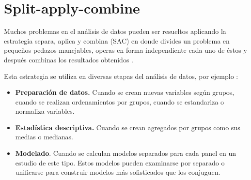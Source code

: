 \documentclass[]{article}
\newenvironment{Shaded}{\begin{snugshade}}{\end{snugshade}}
\newcommand{\KeywordTok}[1]{\textcolor[rgb]{0.13,0.29,0.53}{\textbf{#1}}}
\newcommand{\DecValTok}[1]{\textcolor[rgb]{0.00,0.00,0.81}{#1}}
\newcommand{\StringTok}[1]{\textcolor[rgb]{0.31,0.60,0.02}{#1}}
\newcommand{\OperatorTok}[1]{\textcolor[rgb]{0.81,0.36,0.00}{\textbf{#1}}}
\newcommand{\NormalTok}[1]{#1}
\providecommand{\tightlist}{%
  \setlength{\itemsep}{0pt}\setlength{\parskip}{0pt}}
\begin{document}
\begin{Shaded}
\end{Shaded}

\newpage

\section{Split-apply-combine}\label{split-apply-combine}

Muchos problemas en el análisis de datos pueden ser resueltos aplicando
la estrategia separa, aplica y combina (SAC) en donde divides un
problema en pequeños pedazos manejables, operas en forma independiente
cada uno de éstos y después combinas los resultados obtenidos
\parencite{wickham2011split}.

Esta estrategia se utiliza en diversas etapas del análisis de datos, por
ejemplo \parencite{wickham2011split}:

\begin{itemize}
\tightlist
\item
  \textbf{Preparación de datos.} Cuando se crean nuevas variables según
  grupos, cuando se realizan ordenamientos por grupos, cuando se
  estandariza o normaliza variables.
\item
  \textbf{Estadística descriptiva.} Cuando se crean agregados por grupos
  como sus medias o medianas.
\item
  \textbf{Modelado}. Cuando se calculan modelos separados para cada
  panel en un estudio de este tipo. Estos modelos pueden examinarse por
  separado o unificarse para construir modelos más sofisticados que los
  conjuguen.
\end{itemize}
\end{document}
